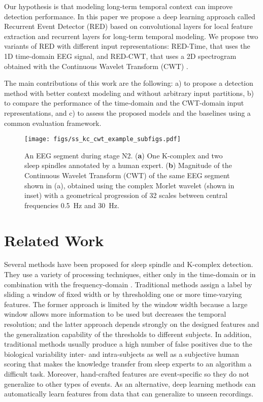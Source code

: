 \documentclass[conference]{IEEEtran}
\begin{document}
Our hypothesis is that modeling long-term temporal context can improve detection performance. In this paper we propose a deep learning approach called Recurrent Event Detector (RED) based on convolutional layers for local feature extraction and recurrent layers for long-term temporal modeling. We propose two variants of RED with different input representations: RED-Time, that uses the 1D time-domain EEG signal, and RED-CWT, that uses a 2D spectrogram obtained with the Continuous Wavelet Transform (CWT) \cite{addison2017illustrated}. 

The main contributions of this work are the following: a) to propose a detection method with better context modeling and without arbitrary input partitions, b) to compare the performance of the time-domain and the CWT-domain input representations, and c) to assess the proposed models and the baselines using a common evaluation framework.


\begin{figure}[tbp]
\centering
\texttt{[image: figs/ss\_kc\_cwt\_example\_subfigs.pdf]}
\caption{An EEG segment during stage N2. (\textbf{a}) One K-complex and two sleep spindles annotated by a human expert. (\textbf{b}) Magnitude of the Continuous Wavelet Transform (CWT) of the same EEG segment shown in (a), obtained using the complex Morlet wavelet (shown in inset) with a geometrical progression of 32 scales between central frequencies 0.5~Hz and 30~Hz.}
\label{fig:ss_kc_cwt_example}
\end{figure}



\section{Related Work}
\label{sec:related}

Several methods have been proposed for sleep spindle and K-complex detection. They use a variety of processing techniques, either only in the time-domain \cite{chambon2019dosed, parekh2017multichannel, larocco2018spindler, held2004dual} or in combination with the frequency-domain \cite{lacourse2019sleep, kulkarni2019deep, lachner2018single, lajnef2017meet, estevez2007sleep, causa2010automated, ulloa2016sleep}. Traditional methods assign a label by sliding a window of fixed width or by thresholding one or more time-varying features. The former approach is limited by the window width because a large window allows more information to be used but decreases the temporal resolution; and the latter approach depends strongly on the designed features and the generalization capability of the thresholds to different subjects. In addition, traditional methods usually produce a high number of false positives due to the biological variability inter- and intra-subjects as well as a subjective human scoring that makes the knowledge transfer from sleep experts to an algorithm a difficult task. Moreover, hand-crafted features are event-specific so they do not generalize to other types of events. As an alternative, deep learning methods can automatically learn features from data that can generalize to unseen recordings. 
\end{document}
